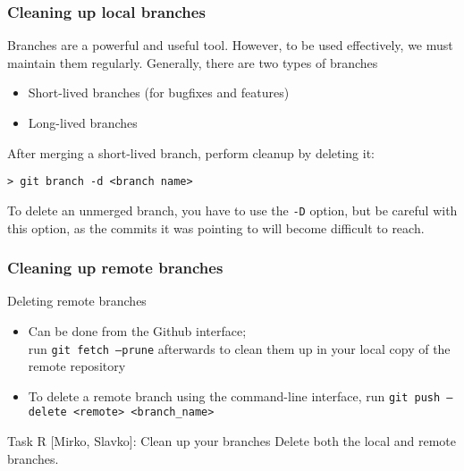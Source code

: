 \begin{frame}[fragile]

\frametitle{Cleaning up local branches}

Branches are a powerful and useful tool. However, to be used effectively, we must maintain them regularly. Generally, there are two types of branches
\begin{itemize}
	\item Short-lived branches (for bugfixes and features)
	\item Long-lived branches
\end{itemize}

After merging a short-lived branch, perform cleanup by deleting it:
\begin{verbatim}
> git branch -d <branch name>
\end{verbatim}

To delete an unmerged branch, you have to use the \texttt{-D} option, but be careful with this option, as the commits it was pointing to will become difficult to reach.

\end{frame}



\begin{frame}[fragile]

\frametitle{Cleaning up remote branches}

\begin{block}{Deleting remote branches}
	\begin{itemize}
	\item Can be done from the Github interface;
	\\ run \texttt{git fetch --prune} afterwards to clean them up in your local copy of the remote repository
	\item To delete a remote branch using the command-line interface, run \texttt{git push --delete <remote> <branch\_name>}
	\end{itemize}
\end{block}	

\begin{block}{Task R [Mirko, Slavko]: Clean up your branches}
	Delete both the local and remote branches.
\end{block}	
\end{frame}



